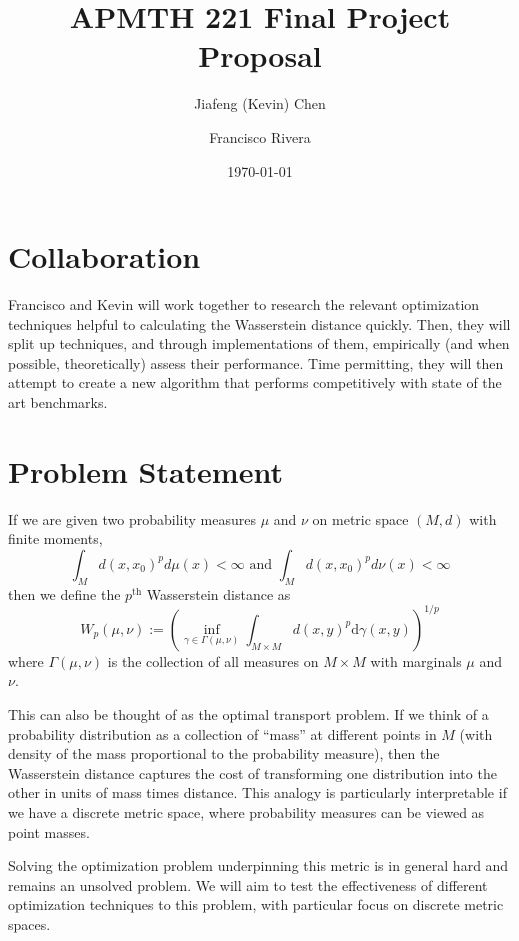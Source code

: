 \documentclass[letter]{amsart}
\begin{document}
\title{APMTH 221 Final Project Proposal}
\author{Jiafeng (Kevin) Chen \and Francisco Rivera}
\date{\today}

\maketitle

\section{Collaboration}

Francisco and Kevin will work together to research the relevant optimization
techniques helpful to calculating the Wasserstein distance quickly. Then, they
will split up techniques, and through implementations of them, empirically (and
when possible, theoretically) assess their performance. Time permitting, they
will then attempt to create a new algorithm that performs competitively with
state of the art benchmarks.

\section{Problem Statement}

If we are given two probability measures $\mu$ and $\nu$ on metric space
$(M,d)$ with finite moments,
\[ \int_M d(x,x_0)^p d\mu(x) < \infty \text{ and }\int_M d(x,x_0)^p d\nu(x) <
\infty\]
then we define the $p^\text{th}$ Wasserstein distance as
\[ W_p(\mu, \nu) := \left( \inf_{\gamma \in \Gamma(\mu, \nu)} \int_{M \times
M} d(x,y)^p \text{d} \gamma(x,y) \right)^{1/p}\]
where $\Gamma(\mu, \nu)$ is the collection of all measures on $M \times M$ with
marginals $\mu$ and $\nu$.


This can also be thought of as the optimal transport problem. If we think of a
probability distribution as a collection of ``mass'' at different points in $M$
(with density of the mass proportional to the probability measure), then the
Wasserstein distance captures the cost of transforming one distribution into the
other in units of mass times distance.  This analogy is particularly
interpretable if we have a discrete metric space, where probability measures can
be viewed as point masses.

Solving the optimization problem underpinning this metric is in general hard and
remains an unsolved problem. We will aim to test the effectiveness of different
optimization techniques to this problem, with particular focus on discrete
metric spaces.
\end{document}
